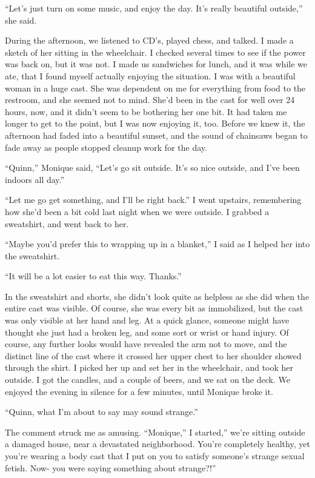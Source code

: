 ``Let's just turn on some music, and enjoy the day. It's really beautiful outside,'' she
said.

During the afternoon, we listened to CD's, played chess, and talked. I made a sketch of
her sitting in the wheelchair. I checked several times to see if the power was back on, but it
was not. I made us sandwiches for lunch, and it was while we ate, that I found myself actually
enjoying the situation. I was with a beautiful woman in a huge cast. She was dependent on me for
everything from food to the restroom, and she seemed not to mind. She'd been in the cast for
well over 24 hours, now, and it didn't seem to be bothering her one bit. It had taken me longer
to get to the point, but I was now enjoying it, too. Before we knew it, the afternoon had faded
into a beautiful sunset, and the sound of chainsaws began to fade away as people stopped cleanup
work for the day.

``Quinn,'' Monique said, ``Let's go sit outside. It's so nice outside, and I've been
indoors all day.''

``Let me go get something, and I'll be right back.'' I went upstairs, remembering how
she'd been a bit cold last night when we were outside. I grabbed a sweatshirt, and went back to
her.

``Maybe you'd prefer this to wrapping up in a blanket,'' I said as I helped her into the
sweatshirt.

``It will be a lot easier to eat this way. Thanks.''

In the sweatshirt and shorts, she didn't look quite as helpless as she did when the entire
cast was visible. Of course, she was every bit as immobilized, but the cast was only visible at
her hand and leg. At a quick glance, someone might have thought she just had a broken leg, and
some sort or wrist or hand injury. Of course, any further looks would have revealed the arm not
to move, and the distinct line of the cast where it crossed her upper chest to her shoulder
showed through the shirt. I picked her up and set her in the wheelchair, and took her outside. I
got the candles, and a couple of beers, and we sat on the deck. We enjoyed the evening in
silence for a few minutes, until Monique broke it.

``Quinn, what I'm about to say may sound strange.''

The comment struck me as amusing. ``Monique,'' I started,'' we're sitting outside a damaged
house, near a devastated neighborhood. You're completely healthy, yet you're wearing a body cast
that I put on you to satisfy someone's strange sexual fetish. Now- you were saying something
about strange?!''

